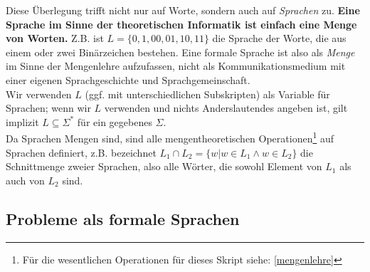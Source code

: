 
Diese Überlegung trifft nicht nur auf Worte, sondern auch auf \emph{Sprachen} zu.
\textbf{Eine Sprache im Sinne der theoretischen Informatik ist einfach eine Menge von Worten.}
Z.B. ist $L = \{0, 1, 00, 01, 10, 11 \}$ die Sprache der Worte,
die aus einem oder zwei Binärzeichen bestehen.
Eine formale Sprache ist also als \emph{Menge} im Sinne der Mengenlehre aufzufassen,
nicht als Kommunikationsmedium mit einer eigenen Sprachgeschichte und Sprachgemeinschaft.\\

\noindent
Wir verwenden $L$ (ggf. mit unterschiedlichen Subskripten) als Variable für Sprachen;
wenn wir $L$ verwenden und nichts Anderslautendes angeben ist,
gilt implizit $L \subseteq \Sigma^*$ für ein gegebenes $\Sigma$.\\

\noindent
Da Sprachen Mengen sind,
sind alle mengentheoretischen Operationen\footnote{
    Für die wesentlichen Operationen für dieses Skript siehe: \autoref{mengenlehre}}
auf Sprachen definiert,
z.B. bezeichnet $L_1 \cap L_2 = \{w | w \in L_1 \wedge w \in L_2\}$
die Schnittmenge zweier Sprachen, also alle Wörter,
die sowohl Element von $L_1$ als auch von $L_2$ sind.



\subsection{Probleme als formale Sprachen}\label{subsec:problemeAlsFormaleSprachen}

